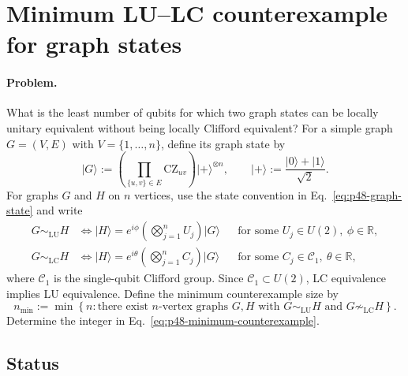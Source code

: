 \section{Minimum LU--LC counterexample for graph states}
\label{sec:op_c37650bfb81dbfc6}

\paragraph{Problem.}
What is the least number of qubits for which two graph states can be locally
unitary equivalent without being locally Clifford equivalent?  For a simple
graph $G=(V,E)$ with $V=\{1,\ldots,n\}$, define its graph state by
\begin{equation}
  \lvert G\rangle
  :=\left(\prod_{\{u,v\}\in E}\mathrm{CZ}_{uv}\right)
    \lvert+\rangle^{\otimes n},
  \qquad
  \lvert+\rangle:=\frac{\lvert0\rangle+\lvert1\rangle}{\sqrt2}.
  \label{eq:p48-graph-state}
\end{equation}
For graphs $G$ and $H$ on $n$ vertices, use the state convention in
Eq.~\eqref{eq:p48-graph-state} and write
\begin{equation}
  \begin{aligned}
    G\sim_{\mathrm{LU}}H
    &\iff
      \lvert H\rangle=e^{i\phi}
      \left(\bigotimes_{j=1}^{n}U_j\right)\lvert G\rangle
      &&\text{for some }U_j\in U(2),\ \phi\in\mathbb R,\\
    G\sim_{\mathrm{LC}}H
    &\iff
      \lvert H\rangle=e^{i\theta}
      \left(\bigotimes_{j=1}^{n}C_j\right)\lvert G\rangle
      &&\text{for some }C_j\in\mathcal C_1,\ \theta\in\mathbb R,
  \end{aligned}
  \label{eq:p48-lu-lc-equivalence}
\end{equation}
where $\mathcal C_1$ is the single-qubit Clifford group.  Since
$\mathcal C_1\subset U(2)$, LC equivalence implies LU equivalence.  Define the
minimum counterexample size by
\begin{equation}
  n_{\min}
  :=\min\left\{n:\text{there exist $n$-vertex graphs $G,H$ with
  $G\sim_{\mathrm{LU}}H$ and $G\not\sim_{\mathrm{LC}}H$}\right\}.
  \label{eq:p48-minimum-counterexample}
\end{equation}
Determine the integer in Eq.~\eqref{eq:p48-minimum-counterexample}.

\subsection*{Status}

